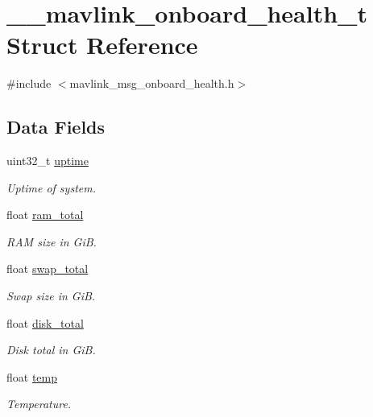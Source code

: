 \hypertarget{struct____mavlink__onboard__health__t}{\section{\+\_\+\+\_\+mavlink\+\_\+onboard\+\_\+health\+\_\+t Struct Reference}
\label{struct____mavlink__onboard__health__t}
}


{\ttfamily \#include $<$mavlink\+\_\+msg\+\_\+onboard\+\_\+health.\+h$>$}

\subsection*{Data Fields}
\begin{DoxyCompactItemize}
\item 
uint32\+\_\+t \hyperlink{struct____mavlink__onboard__health__t_a647c8af29eb0b411c45f6ca364c0f787}{uptime}
\begin{DoxyCompactList}\small\item\em Uptime of system. \end{DoxyCompactList}\item 
float \hyperlink{struct____mavlink__onboard__health__t_a354a96a7515d13bb237e9f472a64622b}{ram\+\_\+total}
\begin{DoxyCompactList}\small\item\em R\+A\+M size in Gi\+B. \end{DoxyCompactList}\item 
float \hyperlink{struct____mavlink__onboard__health__t_ac02728054ffa08ad7ba38cb33622da53}{swap\+\_\+total}
\begin{DoxyCompactList}\small\item\em Swap size in Gi\+B. \end{DoxyCompactList}\item 
float \hyperlink{struct____mavlink__onboard__health__t_aeb4a816f103d80033fed9025f29b79da}{disk\+\_\+total}
\begin{DoxyCompactList}\small\item\em Disk total in Gi\+B. \end{DoxyCompactList}\item 
float \hyperlink{struct____mavlink__onboard__health__t_a2ae43a53307dfeb6844ccc1dd72da9ce}{temp}
\begin{DoxyCompactList}\small\item\em Temperature. \end{DoxyCompactList}\item 

\end{DoxyCompactItemize}
